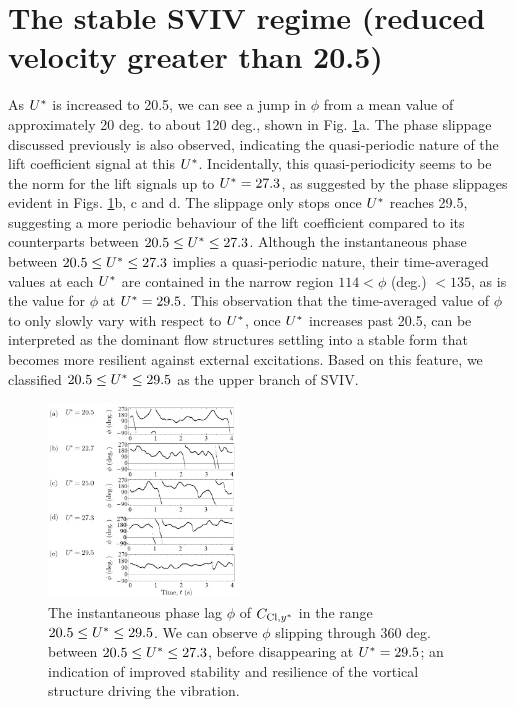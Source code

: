 \documentclass[oneside]{utmthesis}
\begin{document}
\section{The stable SVIV regime (reduced velocity greater than 20.5)} \label{sec:svivRegime}
As $U^{*}$ is increased to 20.5, we can see a jump in $\phi$ from a mean value of approximately 20 deg. to about 120 deg., shown in Fig. \ref{fig:phaseAngle}a. The phase slippage discussed previously is also observed, indicating the quasi-periodic nature of the lift coefficient signal at this $U^{*}$. Incidentally, this quasi-periodicity seems to be the norm for the lift signals up to $U^{*} = 27.3$, as suggested by the phase slippages evident in Figs. \ref{fig:phaseAngle}b, c and d. The slippage only stops once $U^{*}$ reaches 29.5, suggesting a more periodic behaviour of the lift coefficient compared to its counterparts between $20.5 \leq U^{*} \leq 27.3$. Although the instantaneous phase between $20.5 \leq U^{*} \leq 27.3$ implies a quasi-periodic nature, their time-averaged values at each $U^{*}$ are contained in the narrow region $114 < \phi$ (deg.) $< 135$, as is the value for $\phi$ at $U^{*} = 29.5$. This observation that the time-averaged value of $\phi$ to only slowly vary with respect to $U^{*}$, once $U^{*}$ increases past 20.5, can be interpreted as the dominant flow structures settling into a stable form that becomes more resilient against external excitations. Based on this feature, we classified $20.5 \leq U^{*} \leq 29.5$ as the upper branch of SVIV.

\begin{figure}
  \centering
  \includegraphics[width=0.45\textwidth]{figs/phaseAngle}
  \caption{The instantaneous phase lag $\phi$ of $C_{\text{Cl},y^{*}}$ in the range $20.5 \leq U^{*} \leq 29.5$. We can observe $\phi$ slipping through 360 deg. between $20.5 \leq U^{*} \leq 27.3$, before disappearing at $U^{*} = 29.5$; an indication of improved stability and resilience of the vortical structure driving the vibration.}
  \label{fig:phaseAngle}
\end{figure}
\end{document}
